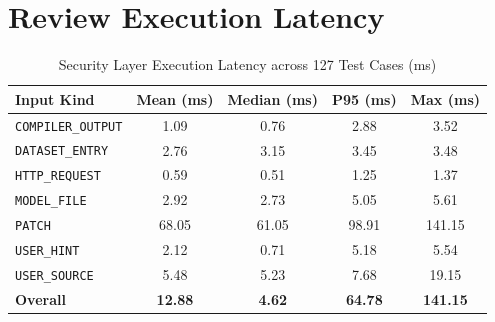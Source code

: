 \documentclass{article}
\begin{document}
\section{Review Execution Latency}
\begin{table}[htbp]
\centering
\caption{Security Layer Execution Latency across 127 Test Cases (ms)}
\label{tab:latency}
\begin{tabularx}{\textwidth}{l c c c c}
\toprule
\textbf{Input Kind} & \textbf{Mean (ms)} & \textbf{Median (ms)} & \textbf{P95 (ms)} & \textbf{Max (ms)} \\
\midrule
\texttt{COMPILER\_OUTPUT} & 1.09 & 0.76 & 2.88 & 3.52 \\
\texttt{DATASET\_ENTRY} & 2.76 & 3.15 & 3.45 & 3.48 \\
\texttt{HTTP\_REQUEST} & 0.59 & 0.51 & 1.25 & 1.37 \\
\texttt{MODEL\_FILE} & 2.92 & 2.73 & 5.05 & 5.61 \\
\texttt{PATCH} & 68.05 & 61.05 & 98.91 & 141.15 \\
\texttt{USER\_HINT} & 2.12 & 0.71 & 5.18 & 5.54 \\
\texttt{USER\_SOURCE} & 5.48 & 5.23 & 7.68 & 19.15 \\
\midrule \textbf{Overall} & \textbf{12.88} & \textbf{4.62} & \textbf{64.78} & \textbf{141.15} \\
\bottomrule
\end{tabularx}
\end{table}
\end{document}
